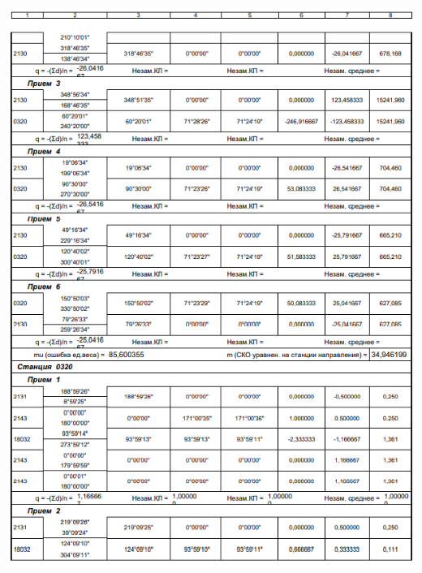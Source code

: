 \documentclass[a4paper]{article}
\begin{document}
\begin{newpage}
\begin{center}
        \includegraphics[scale=1.4]{vedomosty/скп6.png}

\end{center}
\end{newpage}
\end{document}
